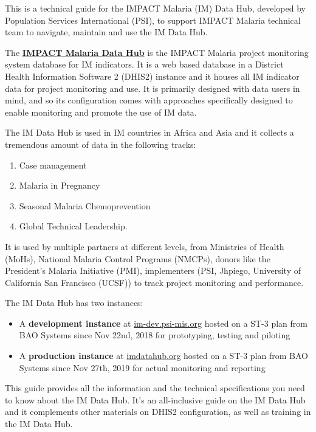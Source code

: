 \documentclass[]{book}
\providecommand{\tightlist}{%
  \setlength{\itemsep}{0pt}\setlength{\parskip}{0pt}}
\begin{document}
This is a technical guide for the IMPACT Malaria (IM) Data Hub, developed by Population Services International (PSI), to support IMPACT Malaria technical team to navigate, maintain and use the IM Data Hub.

The \href{https://imdatahub.org}{\textbf{IMPACT Malaria Data Hub}} is the IMPACT Malaria project monitoring system database for IM indicators. It is a web based database in a District Health Information Software 2 (DHIS2) instance and it houses all IM indicator data for project monitoring and use. It is primarily designed with data users in mind, and so its configuration comes with approaches specifically designed to enable monitoring and promote the use of IM data.

The IM Data Hub is used in IM countries in Africa and Asia and it collects a tremendous amount of data in the following tracks:

\begin{enumerate}
\def\labelenumi{\arabic{enumi}.}
\tightlist
\item
  Case management
\item
  Malaria in Pregnancy
\item
  Seasonal Malaria Chemoprevention
\item
  Global Technical Leadership.
\end{enumerate}

It is used by multiple partners at different levels, from Ministries of Health (MoHs), National Malaria Control Programs (NMCPs), donors like the President's Malaria Initiative (PMI), implementers (PSI, Jhpiego, University of California San Francisco (UCSF)) to track project monitoring and performance.

The IM Data Hub has two instances:

\begin{itemize}
\tightlist
\item
  A \textbf{development instance} at \href{https://im-dev.psi-mis.org}{im-dev.psi-mis.org} hosted on a ST-3 plan from BAO Systems since Nov 22nd, 2018 for prototyping, testing and piloting
\item
  A \textbf{production instance} at \href{https://imdatahub.org}{imdatahub.org} hosted on a ST-3 plan from BAO Systems since Nov 27th, 2019 for actual monitoring and reporting
\end{itemize}

This guide provides all the information and the technical specifications you need to know about the IM Data Hub. It's an all-inclusive guide on the IM Data Hub and it complements other materials on DHIS2 configuration, as well as training in the IM Data Hub.
\end{document}

